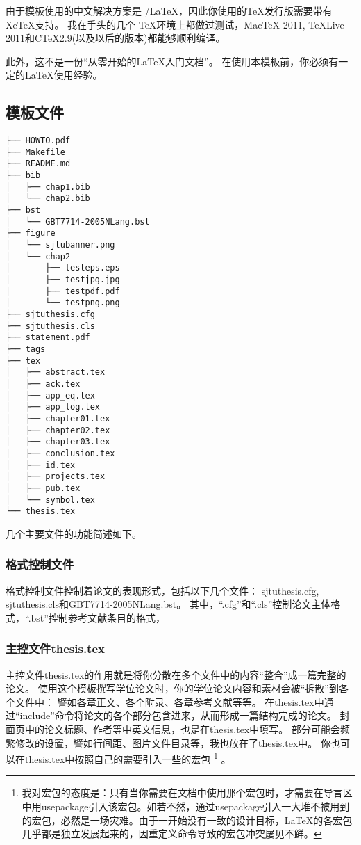 由于模板使用的中文解决方案是 \XeTeX/\LaTeX{}，因此你使用的TeX发行版需要带有XeTeX支持。 
我在手头的几个 \TeX 环境上都做过测试，MacTeX 2011, TeXLive 2011和C\TeX 2.9(以及以后的版本)都能够顺利编译。
 
此外，这不是一份“从零开始的\LaTeX{}入门文档”。
在使用本模板前，你必须有一定的\LaTeX{}使用经验。

\subsection{模板文件}
\label{sec:layout}

\begin{lstlisting}[basicstyle=\small\ttfamily,caption={模板文件布局},label=layout,float,numbers=none]
├── HOWTO.pdf
├── Makefile
├── README.md
├── bib
│   ├── chap1.bib
│   └── chap2.bib
├── bst
│   └── GBT7714-2005NLang.bst
├── figure
│   └── sjtubanner.png
│   └── chap2
│       ├── testeps.eps
│       ├── testjpg.jpg
│       ├── testpdf.pdf
│       └── testpng.png
├── sjtuthesis.cfg
├── sjtuthesis.cls
├── statement.pdf
├── tags
├── tex
│   ├── abstract.tex
│   ├── ack.tex
│   ├── app_eq.tex
│   ├── app_log.tex
│   ├── chapter01.tex
│   ├── chapter02.tex
│   ├── chapter03.tex
│   ├── conclusion.tex
│   ├── id.tex
│   ├── projects.tex
│   ├── pub.tex
│   └── symbol.tex
└── thesis.tex
\end{lstlisting}

几个主要文件的功能简述如下。

\subsubsection{格式控制文件}
\label{sec:format}

格式控制文件控制着论文的表现形式，包括以下几个文件：
sjtuthesis.cfg, sjtuthesis.cls和GBT7714-2005NLang.bst。
其中，``.cfg''和``.cls''控制论文主体格式，``.bst''控制参考文献条目的格式，

\subsubsection{主控文件thesis.tex}
\label{sec:thesistex}

主控文件thesis.tex的作用就是将你分散在多个文件中的内容``整合''成一篇完整的论文。
使用这个模板撰写学位论文时，你的学位论文内容和素材会被``拆散''到各个文件中：
譬如各章正文、各个附录、各章参考文献等等。
在thesis.tex中通过``include''命令将论文的各个部分包含进来，从而形成一篇结构完成的论文。
封面页中的论文标题、作者等中英文信息，也是在thesis.tex中填写。
部分可能会频繁修改的设置，譬如行间距、图片文件目录等，我也放在了thesis.tex中。
你也可以在thesis.tex中按照自己的需要引入一些的宏包
\footnote{我对宏包的态度是：只有当你需要在文档中使用那个宏包时，才需要在导言区中用usepackage引入该宏包。如若不然，通过usepackage引入一大堆不被用到的宏包，必然是一场灾难。由于一开始没有一致的设计目标，\LaTeX 的各宏包几乎都是独立发展起来的，因重定义命令导致的宏包冲突屡见不鲜。}
。

